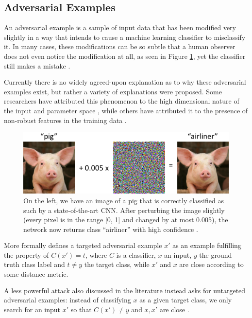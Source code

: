 \subsection{Adversarial Examples}
An adversarial example is a sample of input data that has been modified very slightly in a way that intends to cause a machine learning classifier to misclassify it. In many cases, these modifications can be so subtle that a human observer does not even notice the modification at all, as seen in Figure \ref{fig:adv}, yet the classifier still makes a mistake \parencite{kurakin2016adversarial}.

Currently there is no widely agreed-upon explanation as to why these adversarial examples exist, but rather a variety of explanations were proposed. Some researchers have attributed this phenomenon to the high dimensional nature of the input and parameter space \parencite{goodfellow2014explaining}, while others have attributed it to the presence of non-robust features in the training data \parencite{ilyas2019adversarial}.

\begin{figure}[H]
	\centering
	\includegraphics[width=\textwidth]{images/piggie}
	\caption{On the left, we have an image of a pig that is correctly classified as such by a state-of-the-art \ac{CNN}. After perturbing the image slightly (every pixel is in the range [0, 1] and changed by at most 0.005), the network now returns class “airliner” with high confidence \parencite{mit2018adv}.}
	\label{fig:adv}
\end{figure}
More formally \cite{carlini2017towards} defines a targeted adversarial example $x'$ as an example fulfilling the property of $C(x') = t$, where $C$ is a classifier, $x$ an input, $y$ the ground-truth class label and $t\ne y$ the target class, while $x'$ and $x$ are close according to some distance metric. 

A less powerful attack also discussed in the literature instead asks for untargeted adversarial examples:  instead of classifying $x$ as a given target class, we only search for an input $x'$ so that
$C(x')\ne y$ and $x,x'$ are close \parencite{carlini2017towards}.


